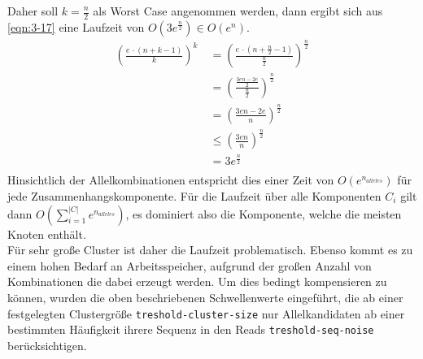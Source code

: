 Daher soll $ k = \frac{n}{2} $ als Worst Case angenommen werden, dann ergibt sich aus \eqref{eqn:3-17} eine Laufzeit von $ O(3e^{\frac{n}{2}} ) \in O(e^n) $. 
\begin{equation} \label{eqn:3-20}
\tag{3-20}
\begin{aligned}
\left( \frac{e \, \cdotp (n + k - 1)}{k}\right)^k &\ {} = \left( \frac{e \, \cdotp (n + \frac{n}{2} - 1)}{\frac{n}{2}}\right)^{\frac{n}{2}}  \\
&\ = \left( \frac{\frac{3en - 2e}{2}} {\frac{n}{2}}\right)^{\frac{n}{2}} \\
&\ = \left( \frac{3en - 2e}{n}\right)^{\frac{n}{2}} \\
&\ \leq \left( \frac{3en}{n}\right)^{\frac{n}{2}}\\
&\ = 3e^{\frac{n}{2}}\\
\end{aligned}
\end{equation}
Hinsichtlich der Allelkombinationen entspricht dies einer Zeit von $ O(e^{n_{alleles}}) $ für jede Zusammenhangskomponente. Für die Laufzeit über alle Komponenten $C_{i}$ gilt dann \linebreak $O\left( \sum\limits_{i=1}^{|C|}e^{n_{alleles}}\right) $, es dominiert also die Komponente, welche die meisten Knoten enthält. \\

Für sehr große Cluster ist daher die Laufzeit problematisch. Ebenso kommt es zu einem hohen Bedarf an Arbeitsspeicher, aufgrund der großen Anzahl von Kombinationen die dabei erzeugt werden. Um dies bedingt kompensieren zu können, wurden die oben beschriebenen Schwellenwerte eingeführt, die ab einer festgelegten Clustergröße \lstinline|treshold-cluster-size| nur Allelkandidaten ab einer bestimmten Häufigkeit ihrere Sequenz in den Reads \linebreak \lstinline|treshold-seq-noise| berücksichtigen.\\

